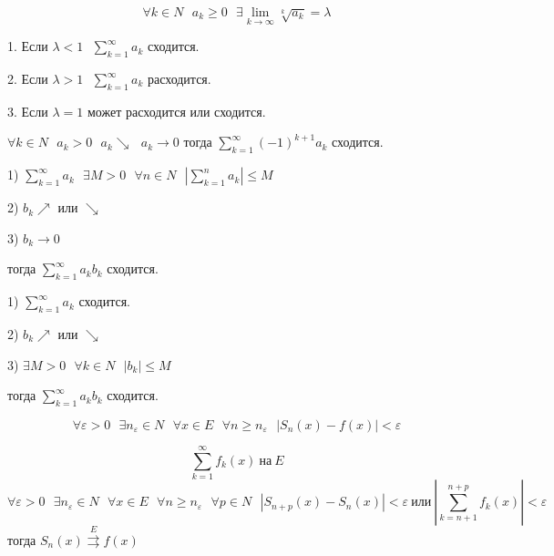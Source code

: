 \documentclass{article}
\begin{document}
\begin{block}
  $$
  \forall k \in N ~~~ a_k \ge 0 ~~~ \exists \lim_{k \to \infty} \sqrt[k]{a_k} =
  \lambda
  $$

  1. Если $\lambda < 1 ~~~ \sum_{k=1}^{\infty} a_k$ сходится.

  2. Если $\lambda > 1 ~~~ \sum_{k=1}^{\infty} a_k$ расходится.

  3. Если $\lambda = 1$ может расходится или сходится.
\end{block}

\begin{block}
  $\forall k \in N ~~~ a_k > 0 ~~~ a_k \searrow ~~~ a_k \to 0$ тогда
  $\sum_{k=1}^{\infty} (-1)^{k+1} a_k$ сходится.
\end{block}

\begin{block}
  1) $\sum_{k=1}^{\infty} a_k ~~~ \exists M > 0 ~~~ \forall n \in N ~~~
  |\sum_{k=1}^n a_k| \le M$

  2) $b_k \nearrow$ или $\searrow$

  3) $b_k \to 0$

  тогда $\sum_{k=1}^{\infty} a_k b_k$ сходится.
\end{block}

\begin{block}
  1) $\sum_{k=1}^{\infty} a_k$ сходится.

  2) $b_k \nearrow$ или $\searrow$

  3) $\exists M > 0 ~~~ \forall k \in N ~~~ |b_k| \le M$

  тогда $\sum_{k=1}^{\infty} a_k b_k$ сходится.
\end{block}

\begin{define}
  $$
  \forall \varepsilon > 0 ~~~ \exists n_{\varepsilon} \in N ~~~ \forall x \in E
  ~~~ \forall n \ge n_{\varepsilon} ~~~ |S_n (x) - f(x)| < \varepsilon
  $$
\end{define}

\begin{block}
  $$
  \sum_{k=1}^{\infty} f_k(x) ~ \text{на} ~ E
  $$
  $$
  \forall \varepsilon > 0 ~~~ \exists n_{\varepsilon} \in N ~~~
  \forall x \in E ~~~ \forall n \ge n_{\varepsilon} ~~~ \forall p \in N ~~~
  |S_{n+p}(x) - S_n(x)| < \varepsilon ~ \text{или} ~
  \left| \sum_{k = n + 1}^{n+p} f_k(x) \right| < \varepsilon
  $$
  тогда $S_n(x) \stackrel{E}{\rightrightarrows} f(x)$
\end{block}
\end{document}

